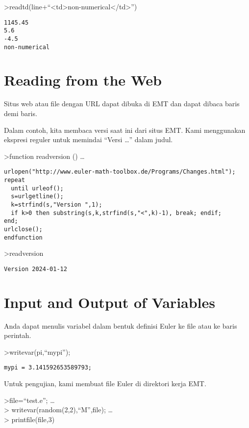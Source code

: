 \documentclass[
]{book}
\begin{document}
\textgreater readtd(line+``\textless td\textgreater non-numerical\textless/td\textgreater{}'')

\begin{verbatim}
1145.45
5.6
-4.5
non-numerical
\end{verbatim}

\section{Reading from the Web}\label{reading-from-the-web}

Situs web atau file dengan URL dapat dibuka di EMT dan dapat dibaca baris demi baris.

Dalam contoh, kita membaca versi saat ini dari situs EMT. Kami menggunakan ekspresi reguler untuk memindai ``Versi \ldots{}'' dalam judul.

\textgreater function readversion () \ldots{}

\begin{verbatim}
urlopen("http://www.euler-math-toolbox.de/Programs/Changes.html");
repeat
  until urleof();
  s=urlgetline();
  k=strfind(s,"Version ",1);
  if k>0 then substring(s,k,strfind(s,"<",k)-1), break; endif;
end;
urlclose();
endfunction
\end{verbatim}

\textgreater readversion

\begin{verbatim}
Version 2024-01-12
\end{verbatim}

\section{Input and Output of Variables}\label{input-and-output-of-variables}

Anda dapat menulis variabel dalam bentuk definisi Euler ke file atau ke baris perintah.

\textgreater writevar(pi,``mypi'');

\begin{verbatim}
mypi = 3.141592653589793;
\end{verbatim}

Untuk pengujian, kami membuat file Euler di direktori kerja EMT.

\textgreater file=``test.e''; \ldots{}\\
\textgreater{} writevar(random(2,2),``M'',file); \ldots{}\\
\textgreater{} printfile(file,3)
\end{document}
